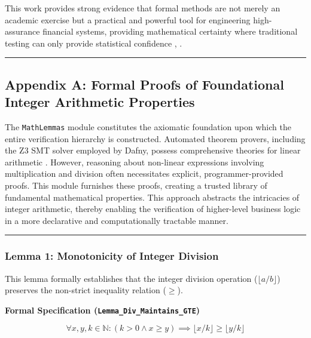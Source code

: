 \documentclass[
  english,
  onecolumn]{article}
\begin{document}
This work provides strong evidence that formal methods are not merely an
academic exercise but a practical and powerful tool for engineering
high-assurance financial systems, providing mathematical certainty where
traditional testing can only provide statistical confidence
,
.

\begin{center}\rule{0.5\linewidth}{0.5pt}\end{center}

\subsection{Appendix A: Formal Proofs of Foundational Integer Arithmetic
Properties}\label{appendix-a-formal-proofs-of-foundational-integer-arithmetic-properties}

The \texttt{MathLemmas} module constitutes the axiomatic foundation upon
which the entire verification hierarchy is constructed. Automated
theorem provers, including the Z3 SMT solver employed by Dafny, possess
comprehensive theories for linear arithmetic
. However, reasoning about
non-linear expressions involving multiplication and division often
necessitates explicit, programmer-provided proofs. This module furnishes
these proofs, creating a trusted library of fundamental mathematical
properties. This approach abstracts the intricacies of integer
arithmetic, thereby enabling the verification of higher-level business
logic in a more declarative and computationally tractable manner.

\begin{center}\rule{0.5\linewidth}{0.5pt}\end{center}

\subsubsection{\texorpdfstring{\textbf{Lemma 1: Monotonicity of Integer
Division}}{Lemma 1: Monotonicity of Integer Division}}\label{lemma-1-monotonicity-of-integer-division}

This lemma formally establishes that the integer division operation
(\(\lfloor a/b \rfloor\)) preserves the non-strict inequality relation
(\(\ge\)).

\textbf{Formal Specification (\texttt{Lemma\_Div\_Maintains\_GTE})}

\[
\forall x, y, k \in \mathbb{N} : (k > 0 \land x \ge y) \implies \lfloor x/k \rfloor \ge \lfloor y/k \rfloor
\]
\end{document}
